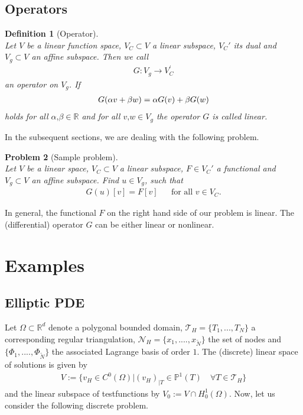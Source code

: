 \documentclass[a4paper,11pt]{article}
\numberwithin{equation}{section}
\newtheorem{definition}{Definition}[section]
\newtheorem{problem}[definition]{Problem}
\newcommand{\theoremNewline}{\hspace{1mm}\\}
\newcommand{\komma}{\text{,}}
\newcommand{\R}{\mathbb{R}}
\begin{document}
    \subsection{Operators}

    \begin{definition}[Operator]\theoremNewline
      \label{definition::abstract_concept::operator}
      Let $V$ be a linear function space, ${V_C \subset V}$ a linear subspace, $V_C'$ its dual and ${V_g \subset V}$
      an affine subspace. Then we call
      \begin{align}
        G : V_g \rightarrow V^{\prime}_C
      \end{align}
      an \textnormal{operator} on $V_g$. If
      \begin{align}
        G(\alpha v + \beta w) = \alpha G(v) + \beta G(w)
          \notag
      \end{align}
      holds for all ${\alpha\komma \beta \in \R}$ and for all ${v\komma w \in V_g}$ the operator $G$ is called
      \textnormal{linear}.
    \end{definition}

    In the subsequent sections, we are dealing with the following problem.

    \begin{problem}[Sample problem]\theoremNewline
      \label{problem::abstract_concept::sample_problem}
      Let $V$ be a linear space, ${V_C \subset V}$ a linear subspace, ${F \in V_C'}$ a functional and
      ${V_g \subset V}$ an affine subspace. Find ${u \in V_g}$, such that
      \begin{align*}
        G(u)[v] = F[v] &&\text{for all } v \in V_C.
      \end{align*}
    \end{problem}

    In general, the functional $F$ on the right hand side of our problem is linear. The (differential) operator $G$
    can be either linear or nonlinear.

  \section{Examples}
    \label{section::examples}

    \subsection{Elliptic PDE}

      Let $\Omega \subset \mathbb{R}^d$ denote a polygonal bounded domain, $\mathcal{T}_H = \{ T_1, ..., T_N \}$ a
      corresponding regular triangulation, $\mathcal{N}_H = \{ x_1, ...., x_{\tilde{N}}\}$ the set of nodes and
      $\{ \Phi_1, ...., \Phi_{\tilde{N}}\}$ the associated Lagrange basis of order $1$. The (discrete) linear space of
      solutions is given by
      \begin{align*}
        V :=
          \Big\{
            v_H \in C^0(\Omega)
          \Big|
            (v_H)_{|T}\in \mathbb{P}^1(T) \quad\forall T \in \mathcal{T}_H
          \Big\}
      \end{align*}
      and the linear subspace of testfunctions by $V_0 := V \cap H^1_0(\Omega)$. Now, let us consider the
      following discrete problem.
\end{document}
